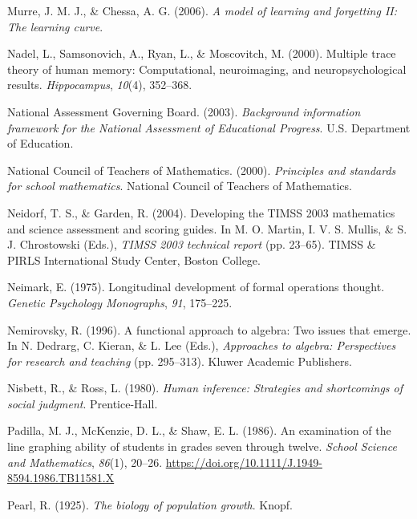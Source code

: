 \documentclass[11pt]{umnthesis}
\newlength{\cslhangindent}
\newenvironment{CSLReferences}[2] %
 {%
  \setlength{\parindent}{0pt}
  \ifodd #1 \everypar{\setlength{\hangindent}{\cslhangindent}}\ignorespaces\fi
  \ifnum #2 > 0
  \setlength{\parskip}{#2\baselineskip}
  \fi
 }%
 {}
\begin{document}
\begin{CSLReferences}{1}{0}
\leavevmode{}%
Murre, J. M. J., \& Chessa, A. G. (2006). \emph{A model of learning and forgetting {II}: The learning curve}.

\leavevmode{}%
Nadel, L., Samsonovich, A., Ryan, L., \& Moscovitch, M. (2000). Multiple trace theory of human memory: Computational, neuroimaging, and neuropsychological results. \emph{Hippocampus}, \emph{10}(4), 352--368.

\leavevmode{}%
National Assessment Governing Board. (2003). \emph{Background information framework for the {National Assessment of Educational Progress}}. U.S. Department of Education.

\leavevmode{}%
National Council of Teachers of Mathematics. (2000). \emph{Principles and standards for school mathematics}. {National Council of Teachers of Mathematics}.

\leavevmode{}%
Neidorf, T. S., \& Garden, R. (2004). Developing the {TIMSS} 2003 mathematics and science assessment and scoring guides. In M. O. Martin, I. V. S. Mullis, \& S. J. Chrostowski (Eds.), \emph{{TIMSS} 2003 technical report} (pp. 23--65). TIMSS \& PIRLS International Study Center, Boston College.

\leavevmode{}%
Neimark, E. (1975). Longitudinal development of formal operations thought. \emph{Genetic Psychology Monographs}, \emph{91}, 175--225.

\leavevmode{}%
Nemirovsky, R. (1996). A functional approach to algebra: Two issues that emerge. In N. Dedrarg, C. Kieran, \& L. Lee (Eds.), \emph{Approaches to algebra: Perspectives for research and teaching} (pp. 295--313). Kluwer Academic Publishers.

\leavevmode{}%
Nisbett, R., \& Ross, L. (1980). \emph{Human inference: Strategies and shortcomings of social judgment}. Prentice-Hall.

\leavevmode{}%
Padilla, M. J., McKenzie, D. L., \& Shaw, E. L. (1986). An examination of the line graphing ability of students in grades seven through twelve. \emph{School Science and Mathematics}, \emph{86}(1), 20--26. \url{https://doi.org/10.1111/J.1949-8594.1986.TB11581.X}

\leavevmode{}%
Pearl, R. (1925). \emph{The biology of population growth}. Knopf.


\end{CSLReferences}
\end{document}
